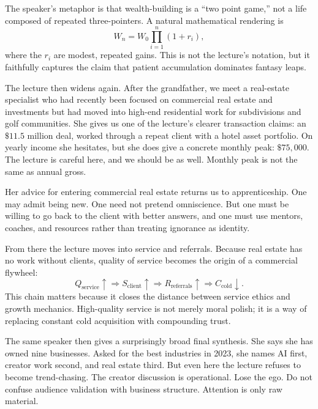 The speaker's metaphor is that wealth-building is a ``two point game,'' not a life composed of repeated three-pointers. A natural mathematical rendering is
\begin{equation}
W_n = W_0 \prod_{i=1}^{n} (1+r_i),
\end{equation}
where the \(r_i\) are modest, repeated gains. This is not the lecture's notation, but it faithfully captures the claim that patient accumulation dominates fantasy leaps.

The lecture then widens again. After the grandfather, we meet a real-estate specialist who had recently been focused on commercial real estate and investments but had moved into high-end residential work for subdivisions and golf communities. She gives us one of the lecture's clearer transaction claims: an \(\$11.5\) million deal, worked through a repeat client with a hotel asset portfolio. On yearly income she hesitates, but she does give a concrete monthly peak: \(\$75{,}000\). The lecture is careful here, and we should be as well. Monthly peak is not the same as annual gross.

Her advice for entering commercial real estate returns us to apprenticeship. One may admit being new. One need not pretend omniscience. But one must be willing to go back to the client with better answers, and one must use mentors, coaches, and resources rather than treating ignorance as identity.

From there the lecture moves into service and referrals. Because real estate has no work without clients, quality of service becomes the origin of a commercial flywheel:
\begin{equation}
Q_{\text{service}}\uparrow
\Rightarrow
S_{\text{client}}\uparrow
\Rightarrow
R_{\text{referrals}}\uparrow
\Rightarrow
C_{\text{cold}}\downarrow.
\end{equation}
This chain matters because it closes the distance between service ethics and growth mechanics. High-quality service is not merely moral polish; it is a way of replacing constant cold acquisition with compounding trust.

The same speaker then gives a surprisingly broad final synthesis. She says she has owned nine businesses. Asked for the best industries in 2023, she names AI first, creator work second, and real estate third. But even here the lecture refuses to become trend-chasing. The creator discussion is operational. Lose the ego. Do not confuse audience validation with business structure. Attention is only raw material.

